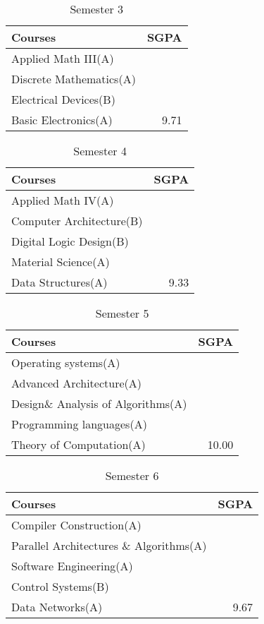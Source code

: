 {\begin{table}[htbp]
\begin{tabular}{|l|r|}
\end{tabular}
\end{table}


\begin{table}[htbp]
\centering
\caption{Semester 3}
\begin{tabular}{|l|r|} \hline
Courses & SGPA \\ \hline
Applied Math III(A)\\
Discrete Mathematics(A)\\
Electrical Devices(B)\\
Basic Electronics(A) & 9.71\\ \hline
\end{tabular}
\end{table}


\begin{table}[htbp]
\centering
\caption{Semester 4}
\begin{tabular}{|l|r|} \hline
Courses & SGPA \\ \hline
Applied Math IV(A)\\
Computer Architecture(B)\\
Digital Logic Design(B)\\
Material Science(A)\\
Data Structures(A) & 9.33\\ \hline
\end{tabular}
\end{table}


\begin{table}[htbp]
\centering
\caption{Semester 5}
\begin{tabular}{|l|r|} \hline
Courses & SGPA \\ \hline
Operating systems(A)\\
Advanced Architecture(A)\\
Design\& Analysis of Algorithms(A)\\
Programming languages(A)\\
Theory of Computation(A) & 10.00\\ \hline
\end{tabular}
\end{table}

\begin{table}[htbp]
\centering
\caption{Semester 6}
\begin{tabular}{|l|r|} \hline
Courses & SGPA \\ \hline
Compiler Construction(A)\\
Parallel Architectures \& Algorithms(A)\\
Software Engineering(A)\\
Control Systems(B)\\
Data Networks(A) & 9.67\\ \hline
\end{tabular}
\end{table}


}
